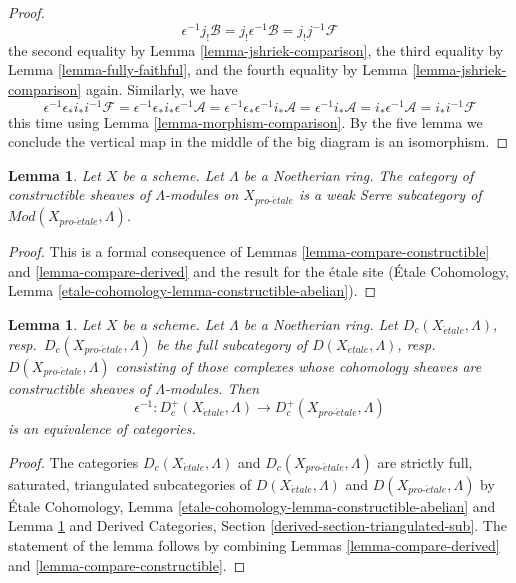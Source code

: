 \documentclass{stacks-project}
\theoremstyle{plain}
\newtheorem{lemma}[subsection]{Lemma}
\theoremstyle{definition}
\theoremstyle{remark}
\numberwithin{equation}{subsection}
\def\proetale{{pro\text{-}\acute{e}tale}}
\def\etale{{\acute{e}tale}}
\begin{document}
\begin{proof}
$$\epsilon^{-1}j_!\mathcal{B} =
j_!\epsilon^{-1}\mathcal{B} =
j_!j^{-1}\mathcal{F}
$$
the second equality by Lemma \ref{lemma-jshriek-comparison},
the third equality by Lemma \ref{lemma-fully-faithful}, and the
fourth equality by Lemma \ref{lemma-jshriek-comparison} again.
Similarly, we have
$$
\epsilon^{-1}\epsilon_*i_*i^{-1}\mathcal{F} =
\epsilon^{-1}\epsilon_*i_*\epsilon^{-1}\mathcal{A} =
\epsilon^{-1}\epsilon_*\epsilon^{-1}i_*\mathcal{A} =
\epsilon^{-1}i_*\mathcal{A} =
i_*\epsilon^{-1}\mathcal{A} =
i_*i^{-1}\mathcal{F}
$$
this time using Lemma \ref{lemma-morphism-comparison}.
By the five lemma we conclude the
vertical map in the middle of the big diagram is an isomorphism.
\end{proof}

\begin{lemma}
\label{lemma-constructible-serre}
Let $X$ be a scheme. Let $\Lambda$ be a Noetherian ring.
The category of constructible sheaves of $\Lambda$-modules on $X_\proetale$
is a weak Serre subcategory of $\textit{Mod}(X_\proetale, \Lambda)$.
\end{lemma}

\begin{proof}
This is a formal consequence of
Lemmas \ref{lemma-compare-constructible} and \ref{lemma-compare-derived}
and the result for the \'etale site
(\'Etale Cohomology, Lemma \ref{etale-cohomology-lemma-constructible-abelian}).
\end{proof}

\begin{lemma}
\label{lemma-compare-constructible-derived}
Let $X$ be a scheme. Let $\Lambda$ be a Noetherian ring.
Let $D_c(X_\etale, \Lambda)$, resp.\ $D_c(X_\proetale, \Lambda)$
be the full subcategory of
$D(X_\etale, \Lambda)$, resp.\ $D(X_\proetale, \Lambda)$
consisting of those complexes whose cohomology sheaves are
constructible sheaves of $\Lambda$-modules. Then
$$
\epsilon^{-1} :
D_c^+(X_\etale, \Lambda)
\longrightarrow
D_c^+(X_\proetale, \Lambda)
$$
is an equivalence of categories.
\end{lemma}

\begin{proof}
The categories $D_c(X_\etale, \Lambda)$ and $D_c(X_\proetale, \Lambda)$
are strictly full, saturated, triangulated subcategories of
$D(X_\etale, \Lambda)$ and $D(X_\proetale, \Lambda)$ by
\'Etale Cohomology, Lemma \ref{etale-cohomology-lemma-constructible-abelian}
and
Lemma \ref{lemma-constructible-serre}
and
Derived Categories, Section \ref{derived-section-triangulated-sub}.
The statement of the lemma follows by combining
Lemmas \ref{lemma-compare-derived} and
\ref{lemma-compare-constructible}.
\end{proof}
\end{document}
